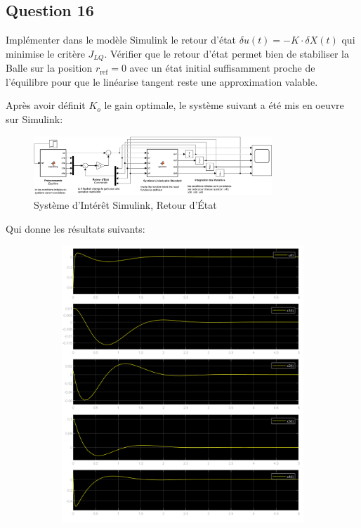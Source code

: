 \documentclass[class=article, crop=false]{standalone}
\begin{document}
\newpage
\subsection{Question 16}
\begin{exercise}
    Implémenter dans le modèle Simulink le retour d'état $\delta u(t) = - K \cdot \delta X(t)$ qui minimise le critère $J_{LQ}$. Vérifier que le retour d'état permet bien de stabiliser la Balle sur la position $r_{\text{ref}} = 0$ avec un état initial suffisamment proche de l'équilibre pour que le linéarise tangent reste une approximation valable.
\end{exercise}
\begin{resolution}
    Après avoir définit $K_{o}$ le gain optimale, le système suivant a été mis en oeuvre sur Simulink:
    \begin{figure}[H]
        \centering
        \includegraphics[width=0.8\textwidth]{../images/system_simulink_3.png}
        \caption{Système d'Intérêt Simulink, Retour d'État}
    \end{figure}
    Qui donne les résultats suivants:
    \begin{figure}[H]
        \centering
        \begin{subfigure}[b]{0.475\textwidth}
            \centering
            \includegraphics[width=\textwidth]{../images/m3_r0_s0.01_o0_o.png}

\end{subfigure}
\end{figure}
\end{resolution}
\end{document}
